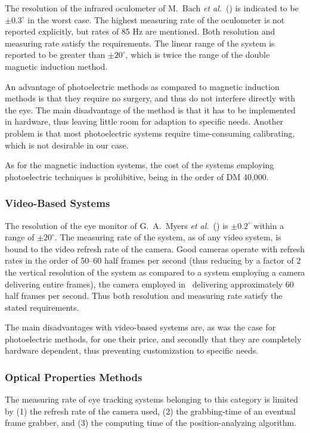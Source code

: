 The resolution of the infrared oculometer of M.\ Bach {\em et
  al.\/}~(\cite{oculometer}) is indicated to be $\pm 0.3^{\circ}$ in
the worst case.  The highest measuring rate of the oculometer is not
reported explicitly, but rates of 85 Hz are mentioned.  Both
resolution and measuring rate satisfy the requirements.  The linear
range of the system is reported to be greater than $\pm 20^{\circ}$,
which is twice the range of the double magnetic induction method.

An advantage of photoelectric methods as compared to magnetic
induction methods is that they require no surgery, and thus do not
interfere directly with the eye.  The main disadvantage of the method
is that it has to be implemented in hardware, thus leaving little room
for adaption to specific needs.  Another problem is that most
photoelectric systems require time-consuming calibrating, which is
not desirable in our case.

As for the magnetic induction systems, the cost of the systems
employing photoelectric techniques is prohibitive, being in the order
of DM 40,000.

\subsubsection{Video-Based Systems}

The resolution of the eye monitor of G.\ A.\ Myers {\em et
  al.\/}~(\cite{monitor}) is $\pm 0.2^{\circ}$ within a range of $\pm
20^{\circ}$.  The measuring rate of the system, as of any video system,
is bound to the video refresh rate of the camera.  Good cameras
operate with refresh rates in the order of 50--60 half frames per
second (thus reducing by a factor of 2 the vertical resolution of the
system as compared to a system employing a camera delivering entire
frames), the camera employed in~\cite{monitor} delivering
approximately 60 half frames per second.  Thus both resolution and
measuring rate satisfy the stated requirements.

The main disadvantages with video-based systems are, as was the case
for photoelectric methods, for one their price, and secondly that they
are completely hardware dependent, thus preventing customization to
specific needs.

\subsubsection{Optical Properties Methods}

The measuring rate of eye tracking systems belonging to this category
is limited by (1) the refresh rate of the camera used, (2) the
grabbing-time of an eventual frame grabber, and (3) the computing time
of the position-analyzing algorithm.

